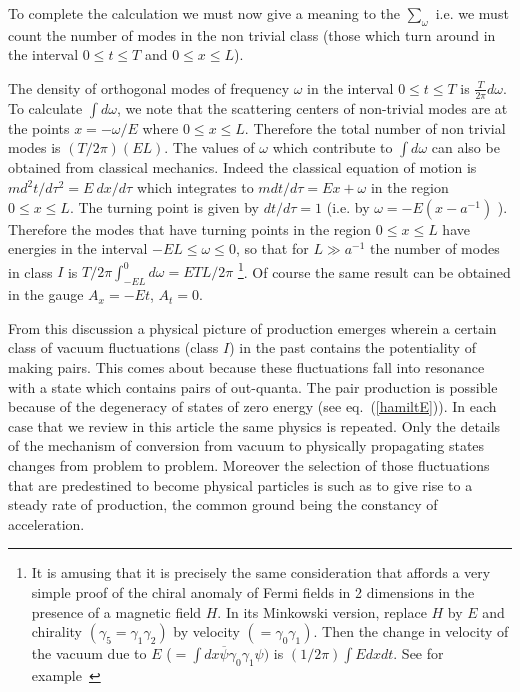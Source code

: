 \documentclass[12pt,oneside]{report}
\begin{document}
To complete the calculation
we must now give a meaning to the $\sum_\omega$ i.e.
we must count the number of modes in the non trivial class (those
which turn around in the interval $0 \leq t \leq T$ and $0 \leq x \leq L$).
\par The density of orthogonal modes of frequency
$\omega$ in the interval $0 \leq t \leq T$ is
$\frac{T}{2\pi} d\omega$.  To calculate $\int d\omega$, we note
that the scattering centers of non-trivial modes are at the points
$x = -\omega/E$ 
where $0 \leq x \leq L$.  Therefore the total number of
non trivial modes is $(T/2\pi)(EL)$.  
The values of $\omega$ which contribute to $\int d\omega$ can also be 
obtained from classical mechanics. Indeed the classical equation 
of motion is
$m d^2t /d\tau^2=E\ dx/d\tau $ which
integrates to $mdt/d\tau=Ex + \omega $ in the region $ 0\leq x\leq
L$. 
The turning point is given by 
$dt/d\tau = 1$ (i.e. by $\omega = - E( x - a^{-1})$ ). Therefore
 the modes that have turning points in the region $ 0\leq x\leq
L$ have energies in the interval $-EL \leq \omega \leq 0$, 
so that for $L\gg a^{-1}$ the number of modes in class $I$ 
is $T/{2\pi} \int_{-EL}^{0} d\omega =  ETL/2\pi$ \footnote{It is amusing that
it is precisely the same consideration that affords
a very simple proof of the chiral anomaly of Fermi fields in 2 dimensions
in the presence of a magnetic field $H$. 
 In its Minkowski version, replace $H$ by $E$ and chirality
$(\gamma_5 = \gamma_1\gamma_2)$ by velocity $(= \gamma_0 \gamma_1)$.  Then
the change in velocity of the vacuum due to $E$ ($= \int dx 
\overline \psi \gamma_0 \gamma_1 \psi)$ is $(1/2\pi) \int Edxdt$. See for 
example~\cite{Nien}}.
 Of course the same result can be obtained
in the gauge $A_x =- Et$, $A_t = 0$.  
\par From this discussion
 a physical picture of production emerges
wherein a certain class of vacuum fluctuations (class $I$) in the past
contains the potentiality of making pairs. This comes about because 
these fluctuations fall into resonance with a state  which contains pairs
of out-quanta. The pair production is possible because of the degeneracy of
states of zero energy (see eq.~(\ref{hamiltE})).
 In each case
that we review in this article the same physics is repeated.  Only the
details of the mechanism of conversion from vacuum to  physically
propagating states
changes from problem to problem. Moreover
the selection of those fluctuations that are predestined to become
physical particles 
is such as to give rise to a steady rate of
production, the common ground being the constancy of acceleration.
\end{document}
